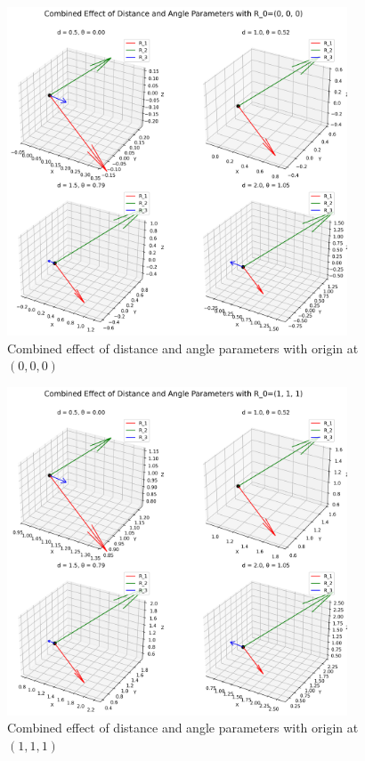 \begin{figure}[H]
    \centering
    \includegraphics[width=0.9\textwidth]{figures/combined_effect_R0_0_0_0.png}
    \caption{Combined effect of distance and angle parameters with origin at $(0,0,0)$}
    \label{fig:example_combined_effect_default}
\end{figure}

\begin{figure}[H]
    \centering
    \includegraphics[width=0.9\textwidth]{figures/combined_effect_R0_1_1_1.png}
    \caption{Combined effect of distance and angle parameters with origin at $(1,1,1)$}
    \label{fig:example_combined_effect_custom1}
\end{figure}

